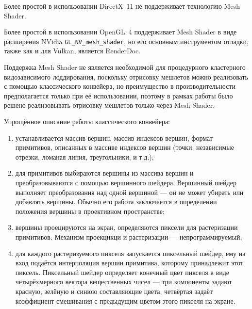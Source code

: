 Более простой в использовании DirectX~11 не поддерживает технологию Mesh Shader.

Более простой в использовании OpenGL~4 поддерживает Mesh Shader в виде расширения NVidia \texttt{GL\_NV\_mesh\_shader}, но его основным инструментом отладки, также как и для Vulkan, является RenderDoc.

Поддержка Mesh Shader не является необходимой для процедурного кластерного видозависимого лоддирования, поскольку отрисовку мешлетов можно реализовать с помощью классического конвейера, но преимущество в производительности предполагается только при её использовании, поэтому в рамках работы было решено реализовывать отрисовку мешлетов только через Mesh Shader.

Упрощённое описание работы классического конвейера:
\begin{enumerate}
    \item устанавливается массив вершин, массив индексов вершин, формат примитивов, описанных в массиве индексов вершин (точки, независимые отрезки, ломаная линия, треугольники, и т.д.);
    \item для примитивов выбираются вершины из массива вершин и преобразовываются с помощью вершинного шейдера.
    Вершинный шейдер выполняет преобразования над одной вершиной --- он не может убирать или добавлять вершины.
    Обычно его работа заключается в определении положения вершины в проективном пространстве;
    \item вершины проецируются на экран, определяются пиксели для растеризации примитивов.
    Механизм проекцикци и растеризации --- непрограммируемый;
    \item для каждого растеризуемого пикселя запускается пиксельный шейдер, ему на вход подаётся интерполяция вершин примитива, которому принадлежит этот пиксель.
    Пиксельный шейдер определяет конечный цвет пикселя в виде четырёхмерного вектора вещественных чисел --- три компоненты задают красную, зелёную и синюю составляющие цвета, четвёртая задаёт коэффициент смешивания с предыдущим цветом этого пикселя на экране.
\end{enumerate}

